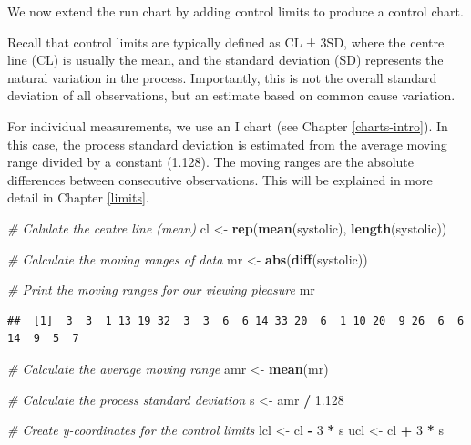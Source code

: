 \documentclass[
]{book}
\newenvironment{Shaded}{\begin{snugshade}}{\end{snugshade}}
\newcommand{\CommentTok}[1]{\textcolor[rgb]{0.56,0.35,0.01}{\textit{#1}}}
\newcommand{\DecValTok}[1]{\textcolor[rgb]{0.00,0.00,0.81}{#1}}
\newcommand{\FloatTok}[1]{\textcolor[rgb]{0.00,0.00,0.81}{#1}}
\newcommand{\FunctionTok}[1]{\textcolor[rgb]{0.13,0.29,0.53}{\textbf{#1}}}
\newcommand{\NormalTok}[1]{#1}
\newcommand{\OtherTok}[1]{\textcolor[rgb]{0.56,0.35,0.01}{#1}}
\newcommand{\SpecialCharTok}[1]{\textcolor[rgb]{0.81,0.36,0.00}{\textbf{#1}}}
\begin{document}
We now extend the run chart by adding control limits to produce a control chart.

Recall that control limits are typically defined as CL ± 3SD, where the centre line (CL) is usually the mean, and the standard deviation (SD) represents the natural variation in the process. Importantly, this is not the overall standard deviation of all observations, but an estimate based on common cause variation.

For individual measurements, we use an I chart (see Chapter \ref{charts-intro}). In this case, the process standard deviation is estimated from the average moving range divided by a constant (1.128). The moving ranges are the absolute differences between consecutive observations. This will be explained in more detail in Chapter \ref{limits}.

\begin{Shaded}
\begin{Highlighting}[]
\CommentTok{\# Calulate the centre line (mean)}
\NormalTok{cl  }\OtherTok{\textless{}{-}} \FunctionTok{rep}\NormalTok{(}\FunctionTok{mean}\NormalTok{(systolic), }\FunctionTok{length}\NormalTok{(systolic))}

\CommentTok{\# Calculate the moving ranges of data}
\NormalTok{mr }\OtherTok{\textless{}{-}} \FunctionTok{abs}\NormalTok{(}\FunctionTok{diff}\NormalTok{(systolic))}

\CommentTok{\# Print the moving ranges for our viewing pleasure}
\NormalTok{mr}
\end{Highlighting}
\end{Shaded}

\begin{verbatim}
##  [1]  3  3  1 13 19 32  3  3  6  6 14 33 20  6  1 10 20  9 26  6  6 14  9  5  7
\end{verbatim}

\begin{Shaded}
\begin{Highlighting}[]
\CommentTok{\# Calculate the average moving range}
\NormalTok{amr }\OtherTok{\textless{}{-}} \FunctionTok{mean}\NormalTok{(mr)}

\CommentTok{\# Calculate the process standard deviation}
\NormalTok{s }\OtherTok{\textless{}{-}}\NormalTok{ amr }\SpecialCharTok{/} \FloatTok{1.128}

\CommentTok{\# Create y{-}coordinates for the control limits}
\NormalTok{lcl }\OtherTok{\textless{}{-}}\NormalTok{ cl }\SpecialCharTok{{-}} \DecValTok{3} \SpecialCharTok{*}\NormalTok{ s}
\NormalTok{ucl }\OtherTok{\textless{}{-}}\NormalTok{ cl }\SpecialCharTok{+} \DecValTok{3} \SpecialCharTok{*}\NormalTok{ s}
\end{Highlighting}
\end{Shaded}
\end{document}
